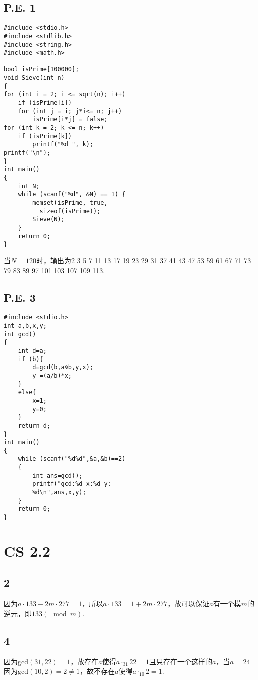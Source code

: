 \documentclass[twocolumn]{article}
\newenvironment{SChinese}{
	\CJKfamily{gbsn}
	\CJKtilde
	\CJKnospace}{}
\begin{document}
\begin{CJK}{UTF8}{}
\begin{SChinese}
				\subsection*{P.E. 1}
					\begin{lstlisting}[language={[ANSI]C}, numberstyle=\tiny,keywordstyle=\color{blue!70},commentstyle=\color{red!50!green!50!blue!50},frame=shadowbox, rulesepcolor=\color{red!20!green!20!blue!20}]
#include <stdio.h>
#include <stdlib.h>
#include <string.h>
#include <math.h>

bool isPrime[100000];
void Sieve(int n)
{
for (int i = 2; i <= sqrt(n); i++)
	if (isPrime[i])
	for (int j = i; j*i<= n; j++)
		isPrime[i*j] = false;
for (int k = 2; k <= n; k++)
	if (isPrime[k])
		printf("%d ", k);
printf("\n");
}
int main()
{
	int N;
	while (scanf("%d", &N) == 1) {
		memset(isPrime, true, 
		  sizeof(isPrime));
		Sieve(N);
	}
	return 0;
}
				\end{lstlisting}
				当$N=120$时，输出为2 3 5 7 11 13 17 19 23 29 31 37 41 43 47 53 59 61 67 71 73 79 83 89 97 101 103 107 109 113.
				\subsection*{P.E. 3}
					\begin{lstlisting}[language={[ANSI]C}, numberstyle=\tiny,keywordstyle=\color{blue!70},commentstyle=\color{red!50!green!50!blue!50},frame=shadowbox, rulesepcolor=\color{red!20!green!20!blue!20}]
#include <stdio.h>
int a,b,x,y;
int gcd()
{
	int d=a;
	if (b){
		d=gcd(b,a%b,y,x);
		y-=(a/b)*x;
	}
	else{
		x=1;
		y=0;
	}
	return d;
}
int main()
{
	while (scanf("%d%d",&a,&b)==2)
	{
		int ans=gcd();
		printf("gcd:%d x:%d y:
		%d\n",ans,x,y);
	}
	return 0;
}

					\end{lstlisting}	
			\section*{CS 2.2}
				\subsection*{2}
					因为$a\cdot133-2m\cdot277=1$，所以$a\cdot133=1+2m\cdot277$，故可以保证$a$有一个模$m$的逆元，即$133(\mod m)$.
				\subsection*{4}
					因为gcd$(31,22)=1$，故存在$a$使得$a\cdot_{31}22=1$且只存在一个这样的$a$，当$a=24$\\
					因为gcd$(10,2)=2\neq1$，故不存在$a$使得$a\cdot_{10}2=1$.

\end{SChinese}
\end{CJK}
\end{document}
